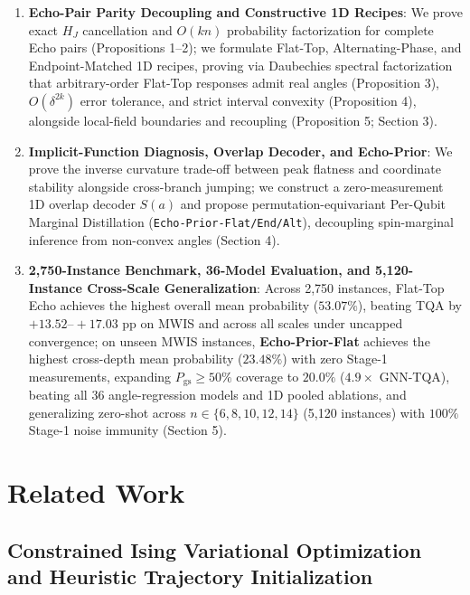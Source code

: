 \documentclass{article}
\theoremstyle{plain}
\theoremstyle{definition}
\begin{document}
\begin{enumerate}\setlength{\itemsep}{0pt}\setlength{\parskip}{1pt}\setlength{\topsep}{1pt}
\item \textbf{Echo-Pair Parity Decoupling and Constructive 1D Recipes}: We prove exact $H_J$ cancellation and $O(kn)$ probability factorization for complete Echo pairs (Propositions 1--2); we formulate Flat-Top, Alternating-Phase, and Endpoint-Matched 1D recipes, proving via Daubechies spectral factorization that arbitrary-order Flat-Top responses admit real angles (Proposition 3), $O(\delta^{2k})$ error tolerance, and strict interval convexity (Proposition 4), alongside local-field boundaries and recoupling (Proposition 5; Section 3).
\item \textbf{Implicit-Function Diagnosis, Overlap Decoder, and Echo-Prior}: We prove the inverse curvature trade-off between peak flatness and coordinate stability alongside cross-branch jumping; we construct a zero-measurement 1D overlap decoder $S(a)$ and propose permutation-equivariant Per-Qubit Marginal Distillation (\texttt{Echo-Prior-Flat/\allowbreak{}End/\allowbreak{}Alt}), decoupling spin-marginal inference from non-convex angles (Section 4).
\item \textbf{2,750-Instance Benchmark, 36-Model Evaluation, and 5,120-Instance Cross-Scale Generalization}: Across 2,750 instances, Flat-Top Echo achieves the highest overall mean probability ($\mathbf{53.07}\%$), beating TQA by $+13.52\text{--}+17.03$ pp on MWIS and across all scales under uncapped convergence; on unseen MWIS instances, \textbf{Echo-Prior-Flat} achieves the highest cross-depth mean probability ($\mathbf{23.48}\%$) with zero Stage-1 measurements, expanding $P_{\mathrm{gs}}\ge 50\%$ coverage to $\mathbf{20.0}\%$ ($4.9\times$ GNN-TQA), beating all 36 angle-regression models and 1D pooled ablations, and generalizing zero-shot across $n\in\{6,8,10,12,14\}$ (5,120 instances) with $100\%$ Stage-1 noise immunity (Section 5).

\end{enumerate}
\section{Related Work}\label{sec:2}

\subsection{Constrained Ising Variational Optimization and Heuristic Trajectory Initialization}\label{subsec:2_1}
\end{document}

